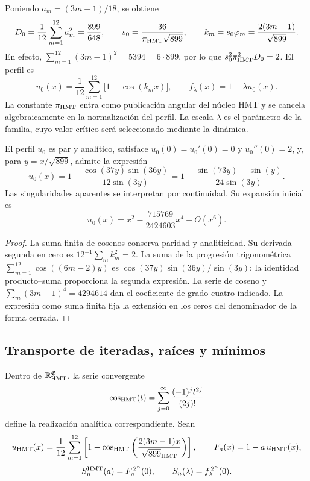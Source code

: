 Poniendo \(a_m=(3m-1)/18\), se obtiene
\[
 D_0=\frac1{12}\sum_{m=1}^{12}a_m^2=\frac{899}{648},
 \qquad
 s_0=\frac{36}{\pi_{\rm HMT}\sqrt{899}},\qquad
 k_m=s_0\varphi_m=\frac{2(3m-1)}{\sqrt{899}}.
\]
En efecto, \(\sum_{m=1}^{12}(3m-1)^2=5394=6\cdot899\), por lo
que \(s_0^2\pi_{\rm HMT}^2D_0=2\). El perfil es
\begin{equation}
 u_0(x)=\frac1{12}\sum_{m=1}^{12}\bigl[1-\cos(k_mx)\bigr],
 \qquad f_\lambda(x)=1-\lambda u_0(x).
 \label{hmtfg:perfil-familia}
\end{equation}
La constante \(\pi_{\rm HMT}\) entra como publicación angular del
núcleo HMT y se cancela algebraicamente en la normalización del perfil.
La escala \(\lambda\) es el parámetro de la familia, cuyo valor crítico
será seleccionado mediante la dinámica.

\begin{proposition}
\label{hmtfg:forma-perfil}
El perfil \(u_0\) es par y analítico, satisface
\(u_0(0)=u_0'(0)=0\) y \(u_0''(0)=2\), y, para
\(y=x/\sqrt{899}\), admite la expresión
\[
 u_0(x)=1-\frac{\cos(37y)\sin(36y)}{12\sin(3y)}
       =1-\frac{\sin(73y)-\sin(y)}{24\sin(3y)}.
\]
Las singularidades aparentes se interpretan por continuidad.
Su expansión inicial es
\[
 u_0(x)=x^2-\frac{715769}{2424603}x^4+O(x^6).
\]
\end{proposition}
\begin{proof}
La suma finita de cosenos conserva paridad y analiticidad. Su derivada
segunda en cero es \(12^{-1}\sum_m k_m^2=2\).
La suma de la progresión trigonométrica
\(\sum_{m=1}^{12}\cos((6m-2)y)\) es
\(\cos(37y)\sin(36y)/\sin(3y)\); la identidad producto--suma
proporciona la segunda expresión. La serie de coseno y
\(\sum_m(3m-1)^4=4294614\) dan el coeficiente de grado cuatro
indicado. La expresión como suma finita fija la extensión en los
ceros del denominador de la forma cerrada.
\end{proof}

\subsection{Transporte de iteradas, raíces y mínimos}
\label{hmtfg:transporte-raices}

Dentro de \(\mathbb R_{\rm HMT}^{\mathfrak G}\), la serie convergente
\[
 \cos_{\rm HMT}(t)=\sum_{j=0}^{\infty}
                   \frac{(-1)^j t^{2j}}{(2j)!}
\]
define la realización analítica correspondiente. Sean
\[
 u_{\rm HMT}(x)=\frac1{12}\sum_{m=1}^{12}
  \left[1-\cos_{\rm HMT}
   \left(\frac{2(3m-1)x}{\sqrt{899}_{\rm HMT}}\right)\right],
 \qquad F_a(x)=1-a\,u_{\rm HMT}(x),
\]
\[
 S_n^{\rm HMT}(a)=F_a^{\,2^n}(0),\qquad
 S_n(\lambda)=f_\lambda^{\,2^n}(0).
\]

